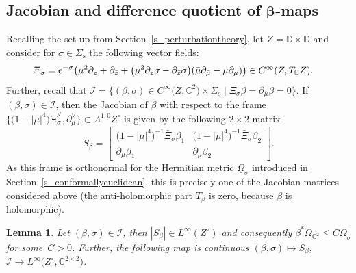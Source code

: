 \documentclass[10pt,a4paper]{amsart}
\numberwithin{equation}{section}
\newtheorem{Lemma}[Theorem]{Lemma}
\theoremstyle{definition}
\newcommand{\C}{\mathbb{C}} %
\newcommand{\DD}{\mathbb{D}} %
\newcommand{\1}{{\bf 1}}
\newcommand{\Om}{{\underline{\Omega}}}
\begin{document}
\subsection[Jacobian and difference quotient of beta-maps]{Jacobian and difference quotient of $\boldsymbol{\beta}$-maps}

Recalling the set-up from Section~\ref{s_perturbationtheory}, let $Z=\DD\times \DD$ and consider for $\sigma\in \Sigma_\mathrm{s}$ the following vector fields:
\begin{align*}
	\Xi_\sigma&={\rm e}^{-\sigma} \bigl(\mu^2\partial_z+\partial_{\bar z} + \bigl(\mu^2 \partial_z\sigma - \partial_{\bar z}\sigma\bigr)(\bar \mu \partial_{\bar \mu} - \mu \partial_\mu) \bigr) \in C^\infty(Z,T_\C Z).
\end{align*}
Further, recall that
$
\mathcal I=\big\{(\beta,\sigma)\in C^\infty\bigl(Z,\C^2\bigr)\times \Sigma_\mathrm{s}\mid \Xi_\sigma\beta = \partial_{\bar \mu} \beta=0\big\}
$. If $(\beta,\sigma)\in \mathcal I$, then the Jacobian of $\beta$ with respect to the frame $\big\{\bigl(1-|\mu|^4\bigr)\bar \Xi_\sigma^\vee,\partial_\mu^\vee\big\}\subset \Lambda^{1,0}Z^\circ$ is given by the following $2\times 2$-matrix
\[
		S_\beta = \begin{bmatrix}
			\bigl(1-|\mu|^4\bigr)^{-1}\bar \Xi_\sigma \beta_1 & \bigl(1-|\mu|^4\bigr)^{-1}\bar \Xi_\sigma \beta_2\\
			\partial_\mu \beta_1 & \partial_\mu \beta_2
		\end{bmatrix}.
\]
As this frame is orthonormal for the Hermitian metric $\Om_\sigma$ introduced in Section~\ref{s_conformallyeuclidean}, this is precisely one of the Jacobian matrices considered above (the anti-holomorphic part $T_\beta$ is zero, because $\beta$ is holomorphic).


\begin{Lemma}\label{sbetacts} Let $(\beta,\sigma)\in \mathcal I$, then $|S_\beta|\in L^\infty(Z^\circ)$ and consequently $\beta^*\Omega_{\C^2} \le C \Om_\sigma$ for some~${C>0}$. Further, the following map is continuous
$(\beta,\sigma)\mapsto S_\beta$, $ \mathcal I\rightarrow L^\infty\bigl(Z^\circ,\C^{2\times 2}\bigr)$.
\end{Lemma}
\end{document}
